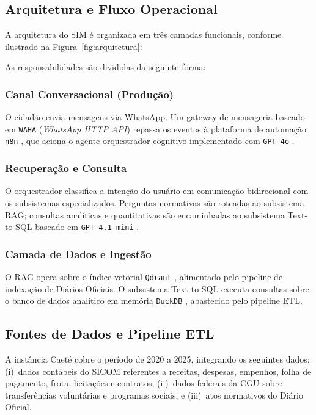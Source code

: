 \documentclass[12pt]{article}
\begin{document}
\subsection{Arquitetura e Fluxo Operacional}

A arquitetura do SIM é organizada em três camadas funcionais, conforme ilustrado na Figura~\ref{fig:arquitetura}:



As responsabilidades são divididas da seguinte forma:

\subsubsection*{Canal Conversacional (Produção)}
O cidadão envia mensagens via WhatsApp. Um gateway de mensageria baseado em \texttt{WAHA} (\textit{WhatsApp HTTP API}) \cite{WAHA2024} repassa os eventos à plataforma de automação \texttt{n8n} \cite{n8n2024}, que aciona o agente orquestrador cognitivo implementado com \texttt{GPT-4o} \cite{OpenAI2024}.

\subsubsection*{Recuperação e Consulta}
O orquestrador classifica a intenção do usuário em comunicação bidirecional com os subsistemas especializados. Perguntas normativas são roteadas ao subsistema RAG; consultas analíticas e quantitativas são encaminhadas ao subsistema Text-to-SQL baseado em \texttt{GPT-4.1-mini} \cite{OpenAI2024}.

\subsubsection*{Camada de Dados e Ingestão}
O RAG opera sobre o índice vetorial \texttt{Qdrant} \cite{Qdrant2024}, alimentado pelo pipeline de indexação de Diários Oficiais. O subsistema Text-to-SQL executa consultas sobre o banco de dados analítico em memória \texttt{DuckDB} \cite{DuckDB2024}, abastecido pelo pipeline ETL.

\subsection{Fontes de Dados e Pipeline ETL}

A instância Caeté cobre o período de 2020 a 2025, integrando os seguintes dados: (i)~dados contábeis do SICOM referentes a receitas, despesas, empenhos, folha de pagamento, frota, licitações e contratos; (ii)~dados federais da CGU sobre transferências voluntárias e programas sociais; e (iii)~atos normativos do Diário Oficial.
\end{document}
